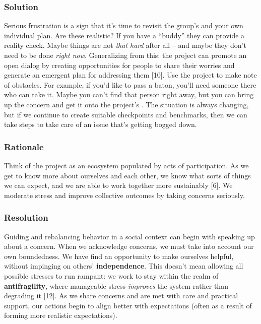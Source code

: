 \hypertarget{solution}{%
\subsubsection{Solution}\label{solution}}

Serious frustration is a sign that it's time to revisit the group's and
your own individual plan. Are these realistic? If you have a ``buddy''
they can provide a reality check. Maybe things are not \emph{that hard}
after all -- and maybe they don't need to be done \emph{right now}.
Generalizing from this: the project can promote an open dialog by
creating opportunities for people to share their worries and generate an
emergent plan for addressing them {{[}10{]}}. Use the project to make
note of obstacles. For example, if you'd like to pass a baton, you'll
need someone there who can take it. Maybe you can't find that person
right away, but you can bring up the concern and get it onto the
project's . The situation is always changing, but if we continue to
create suitable checkpoints and benchmarks, then we can take steps to
take care of an issue that's getting bogged down.

\hypertarget{rationale}{%
\subsubsection{Rationale}\label{rationale}}

Think of the project as an ecosystem populated by acts of participation.
As we get to know more about ourselves and each other, we know what
sorts of things we can expect, and we are able to work together more
sustainably {{[}6{]}}. We moderate stress and improve collective
outcomes by taking concerns seriously.

\hypertarget{resolution}{%
\subsubsection{Resolution}\label{resolution}}

Guiding and rebalancing behavior in a social context can begin with
speaking up about a concern. When we acknowledge concerns, we must take
into account our own boundedness. We have find an opportunity to make
ourselves helpful, without impinging on others' \textbf{independence}.
This doesn't mean allowing all possible stresses to run rampant: we work
to stay within the realm of \textbf{antifragility}, where manageable
stress \emph{improves} the system rather than degrading it {{[}12{]}}.
As we share concerns and are met with care and practical support, our
actions begin to align better with expectations (often as a result of
forming more realistic expectations).

